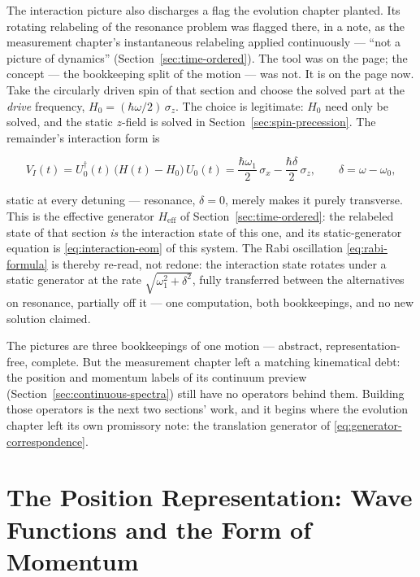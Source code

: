 The interaction picture also discharges a flag the evolution chapter planted. Its rotating relabeling of the resonance problem was flagged there, in a note, as the measurement chapter's instantaneous relabeling applied continuously --- ``not a picture of dynamics'' (Section~\ref{sec:time-ordered}). The tool was on the page; the concept --- the bookkeeping split of the motion --- was not. It is on the page now. Take the circularly driven spin of that section and choose the solved part at the \emph{drive} frequency, $H_0 = (\hbar\omega/2)\,\sigma_z$. The choice is legitimate: $H_0$ need only be solved, and the static $z$-field is solved in Section~\ref{sec:spin-precession}. The remainder's interaction form is
\begin{linenomath}
    \begin{equation*}
        V_I(t) = U_0^\dagger(t)\,\bigl(H(t) - H_0\bigr)\,U_0(t) = \frac{\hbar\omega_1}{2}\,\sigma_x - \frac{\hbar\delta}{2}\,\sigma_z, \qquad \delta = \omega - \omega_0,
    \end{equation*}
\end{linenomath}
static at every detuning --- resonance, $\delta = 0$, merely makes it purely transverse. This is the effective generator $H_{\mathrm{eff}}$ of Section~\ref{sec:time-ordered}: the relabeled state of that section \emph{is} the interaction state of this one, and its static-generator equation is \eqref{eq:interaction-eom} of this system. The Rabi oscillation \eqref{eq:rabi-formula} is thereby re-read, not redone: the interaction state rotates under a static generator at the rate $\sqrt{\omega_1^2 + \delta^2}$, fully transferred between the alternatives on resonance, partially off it --- one computation, both bookkeepings, and no new solution claimed.

The pictures are three bookkeepings of one motion --- abstract, representation-free, complete. But the measurement chapter left a matching kinematical debt: the position and momentum labels of its continuum preview (Section~\ref{sec:continuous-spectra}) still have no operators behind them. Building those operators is the next two sections' work, and it begins where the evolution chapter left its own promissory note: the translation generator of \eqref{eq:generator-correspondence}.

\section{The Position Representation: Wave Functions and the Form of Momentum}
\label{sec:position-representation}

